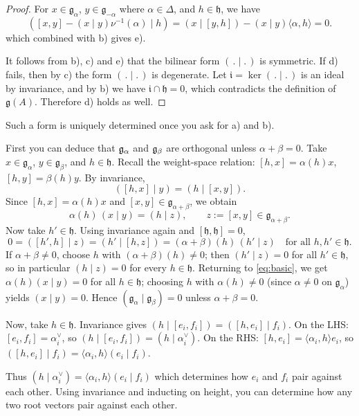 \documentclass[12pt]{article}
\begin{document}
\begin{proof}
    For $x \in \mathfrak{g}_\alpha$, $y \in \mathfrak{g}_{-\alpha}$ where $\alpha \in \Delta$, and $h \in \mathfrak{h}$, we have
    \[
        ([x,y] - (x \mid y)\nu^{-1}(\alpha) \mid h)
        = (x \mid [y,h]) - (x \mid y)\langle \alpha,h\rangle = 0.
    \]
    which combined with b) gives e).

    It follows from b), c) and e) that the bilinear form $(\,.\mid.\,)$ is symmetric. If d) fails, then by c) the form $(\,.\mid.\,)$ is degenerate. Let $\mathfrak{i} = \ker(\,.\mid.\,)$ is an ideal by invariance, and by b) we have $\mathfrak{i}\cap \mathfrak{h}=0$, which contradicts the definition of $\mathfrak{g}(A)$. Therefore d) holds as well.
\end{proof}

\begin{remark}
    Such a form is uniquely determined once you ask for a) and b).

    First you can deduce that $\mathfrak{g}_\alpha$ and $\mathfrak{g}_\beta$ are orthogonal unless $\alpha+\beta=0$.
    Take $x \in \mathfrak{g}_\alpha$, $y \in \mathfrak{g}_\beta$, and $h \in \mathfrak{h}$. Recall the weight-space relation:
    $[h, x] = \alpha(h)x$, $[h,y] = \beta(h)y$. By invariance,
    \[
        ([h,x]\mid y)=(h\mid [x,y]).
    \]
    Since $[h,x]=\alpha(h)x$ and $[x,y]\in\mathfrak{g}_{\alpha+\beta}$, we obtain
    \begin{equation}\label{eq:basic}
        \alpha(h)\,(x\mid y)=(h\mid z),\qquad z:=[x,y]\in\mathfrak{g}_{\alpha+\beta}.
    \end{equation}
    Now take $h'\in\mathfrak{h}$. Using invariance again and $[\mathfrak{h},\mathfrak{h}]=0$,
    \[
        0=([h',h]\mid z)=(h'\mid [h,z])=(\alpha+\beta)(h)\,(h'\mid z)\quad\text{for all }h,h'\in\mathfrak{h}.
    \]
    If $\alpha+\beta\neq 0$, choose $h$ with $(\alpha+\beta)(h)\neq 0$; then $(h'\mid z)=0$ for all
    $h'\in\mathfrak{h}$, so in particular $(h\mid z)=0$ for every $h\in\mathfrak{h}$. Returning to
    \eqref{eq:basic}, we get $\alpha(h)(x\mid y)=0$ for all $h\in\mathfrak{h}$; choosing $h$ with
    $\alpha(h)\neq 0$ (since $\alpha\neq 0$ on $\mathfrak{g}_\alpha$) yields $(x\mid y)=0$.
    Hence $(\mathfrak{g}_\alpha\mid\mathfrak{g}_\beta)=0$ unless $\alpha+\beta=0$.


    Now, take $h \in \mathfrak{h}$. Invariance gives $(h \mid [e_i, f_i]) = ([h, e_i] \mid f_i)$.
    On the LHS: $[e_i, f_i] = \alpha_i^\vee$, so $(h \mid [e_i, f_i]) = (h \mid \alpha_i^\vee)$. On the RHS: $[h, e_i] = \langle \alpha_i, h \rangle e_i$, so
    $([h, e_i] \mid f_i) = \langle \alpha_i, h \rangle (e_i \mid f_i)$.

    Thus $(h \mid \alpha_i^\vee) = \langle \alpha_i, h \rangle (e_i \mid f_i)$ which determines how $e_i$ and $f_i$ pair against each other. Using invariance and inducting on height, you can determine how any two root vectors pair against each other.
\end{remark}
\end{document}
